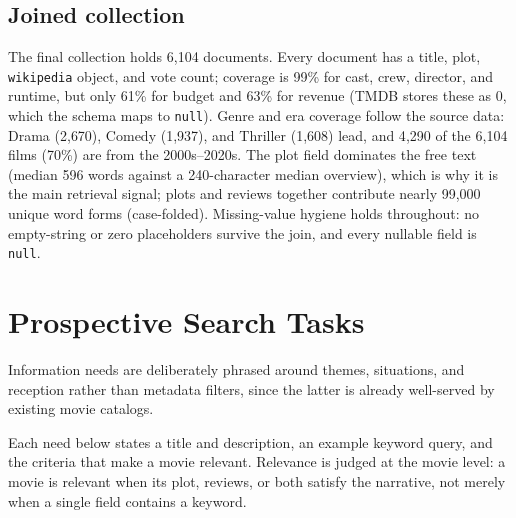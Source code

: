 \documentclass[sigconf]{acmart}
\begin{document}
\subsection{Joined collection}
The final collection holds 6{,}104 documents. Every document has a title, plot,
\texttt{wikipedia} object, and vote count; coverage is 99\% for cast, crew, director,
and runtime, but only 61\% for budget and 63\% for revenue (TMDB stores these as 0,
which the schema maps to \texttt{null}). Genre and era coverage follow the source
data: Drama (2{,}670), Comedy (1{,}937), and Thriller (1{,}608) lead, and 4{,}290 of
the 6{,}104 films (70\%) are from the 2000s--2020s. The plot field dominates the free
text (median 596 words against a 240-character median overview), which is why it is
the main retrieval signal; plots and reviews together contribute nearly 99{,}000
unique word forms (case-folded). Missing-value hygiene holds throughout: no
empty-string or zero placeholders survive the join, and every nullable field is
\texttt{null}.

\section{Prospective Search Tasks}
\label{sec:needs}
Information needs are deliberately phrased around themes, situations, and reception
rather than metadata filters, since the latter is already well-served by existing
movie catalogs.

Each need below states a title and description, an example keyword query, and the
criteria that make a movie relevant. Relevance is judged at the movie level: a movie is
relevant when its plot, reviews, or both satisfy the narrative, not merely when a single
field contains a keyword.
\end{document}
